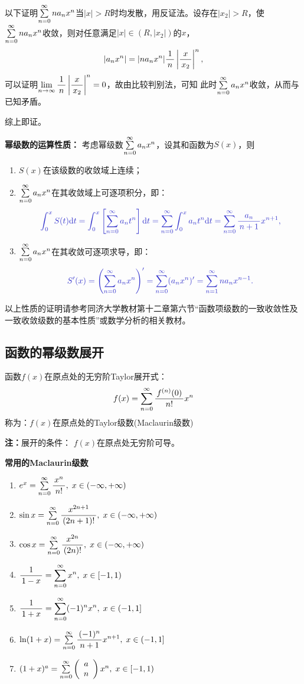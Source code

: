 以下证明$\sumn[0]na_nx^n$当$|x|>R$时均发散，用反证法。设存在$|x_2|>R$，使
$\sumn[0]na_nx^n$收敛，则对任意满足$|x|\in(R,|x_2|)$的$x$，
$$|a_nx^n|=|na_nx^n|\df1n\left|\df{x}{x_2}\right|^n,$$
可以证明$\limn\df1n\left|\df{x}{x_2}\right|^n=0$，故由比较判别法，可知
此时$\sumn[0]a_nx^n$收敛，从而与已知矛盾。

综上即证。\fin

\begin{thx}
	{\bf 幂级数的运算性质：}
	考虑幂级数$\sumn[0]a_nx^n$，设其和函数为$S(x)$，则
	\begin{enumerate}
	  \item $S(x)$在该级数的收敛域上连续；
	  \item $\sumn[0]a_nx^n$在其收敛域上可逐项积分，即：
	  $$\b \dint_0^xS(t)\d t=\dint_0^x\left[\sumn[0]a_nt^n\right]\d t
	  =\sumn[0]\dint_0^xa_nt^n\d t=\sumn[0]\df{a_n}{n+1}x^{n+1},$$
	  \item $\sumn[0]a_nx^n$在其收敛可逐项求导，即：
	  $$\b S'(x)=\left(\sumn[0]a_nx^n\right)'
	  =\sumn[0](a_nx^n)'=\sumn na_nx^{n-1}.$$
	\end{enumerate}
\end{thx}

以上性质的证明请参考{\kaishu 同济大学教材第十二章第六节“函数项级数的一致收敛性及
一致收敛级数的基本性质”}或{\kaishu 数学分析}的相关教材。

\subsection{函数的幂级数展开}

函数$f(x)$在原点处的无穷阶Taylor展开式：
$$f(x)=\sum\limits_{n=0}^{\infty}\df{f^{(n)}(0)}{n!}x^n$$
 称为：{\kaishu $f(x)$在原点处的Taylor级数(Maclaurin级数)}

{\bf 注：}展开的条件： $f(x)$在原点处无穷阶可导。

\begin{thx}
	{\bf 常用的Maclaurin级数}
	\begin{enumerate}
	  \item $e^x=\sumn[0]\df{x^n}{n!},\;x\in(-\infty,+\infty)$
	  \item $\sin x=\sumn[0]\df{x^{2n+1}}{(2n+1)!},\;x\in(-\infty,+\infty)$
	  \item $\cos x=\sumn[0]\df{x^{2n}}{(2n)!},\;x\in(-\infty,+\infty)$
	  \item $\df1{1-x}=\sumn[0]x^n,\;x\in[-1,1)$
	  \item $\df1{1+x}=\sumn[0](-1)^nx^n,\;x\in(-1,1]$
	  \item $\ln(1+x)=\sumn[0]\df{(-1)^n}{n+1}x^{n+1},\;x\in(-1,1]$
	  \item $(1+x)^a=\sumn[0]\left(\begin{array}{c}
	  	a \\ n
	  \end{array}\right)x^n,\;x\in[-1,1)$
	\end{enumerate}
\end{thx}

